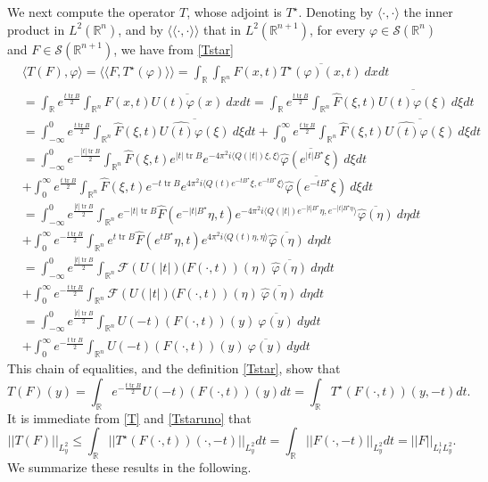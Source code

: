 \documentclass[11pt,letter]{amsart}
\def \phi {\varphi}
\def \R {\mathbb{R}}
\def \vf{\varphi}
\def \So {\mathscr{S}(\Rn)}
\newcommand{\Rn}{\mathbb R^n}
\numberwithin{equation}{section}
\newcommand{\tr}{\operatorname{tr}}
\newcommand{\sa}{\langle}
\newcommand{\da}{\rangle}
\numberwithin{equation}{section}
\begin{document}
We next compute the operator $T$, whose adjoint is $T^\star$. Denoting by $\sa \cdot,\cdot \da$ the inner product in $L^2(\Rn)$, and by $\sa\sa\cdot,\cdot\da\da$ that in $L^2(\R^{n+1})$, for every $\vf\in \So$ and $F\in \mathscr S(\R^{n+1})$, we  have from \eqref{Tstar} 
{\allowdisplaybreaks
\begin{align*}
& \sa T(F),\vf\da = \sa\sa F,T^\star(\vf)\da\da = \int_\R \int_{\Rn} F(x,t) \overline{T^\star(\vf)(x,t)}\ dx dt
\\
& =  \int_\R e^{\frac{t \tr B}2} \int_{\Rn} F(x,t)  \overline{U(t)\vf(x)}\  dx dt = \int_\R e^{\frac{t \tr B}2} \int_{\Rn} \hat F(\xi,t)  \overline{\widehat{U(t)\vf}(\xi)}\  d\xi dt 
\\
& = \int_{-\infty}^0 e^{\frac{t \tr B}2} \int_{\Rn} \hat F(\xi,t)  \overline{\widehat{U(t)\vf}(\xi)}\  d\xi dt  + \int_0^\infty e^{\frac{t \tr B}2} \int_{\Rn} \hat F(\xi,t)  \overline{\widehat{U(t)\vf}(\xi)}\  d\xi dt 
\\
&  = \int_{-\infty}^0 e^{-\frac{|t| \tr B}2} \int_{\Rn} \hat F(\xi,t) e^{|t| \tr B} e^{-4\pi^{2}i\langle Q(|t|)\xi,\xi\rangle} \overline{\hat{\phi}(e^{|t|B^{\star}}\xi)}\  d\xi dt 
\\
& + \int_0^\infty e^{\frac{t \tr B}2} \int_{\Rn} \hat F(\xi,t) e^{-t \tr B}e^{4\pi^{2}i\langle Q(t)e^{-tB^{\star}}\xi, e^{-tB^{\star}}\xi\rangle} \overline{\hat{\phi}(e^{-tB^{\star}}\xi)}\  d\xi dt 
\\
&  = \int_{-\infty}^0 e^{\frac{|t| \tr B}2} \int_{\Rn} e^{-|t| \tr B} \hat F(e^{-|t|B^{\star}}\eta,t) e^{-4\pi^{2}i \langle Q(|t|) e^{-|t|B^\star} \eta,e^{-|t|B^\star \eta}\rangle} \overline{\hat{\phi}(\eta)}\  d\eta dt 
\\
& + \int_0^\infty e^{-\frac{t \tr B}2} \int_{\Rn} e^{t \tr B}\hat F(e^{tB^\star}\eta,t) e^{4\pi^{2}i\langle Q(t)\eta,\eta\rangle} \overline{\hat{\phi}(\eta)}\  d\eta dt 
\\
& = \int_{-\infty}^0 e^{\frac{|t| \tr B}2} \int_{\Rn}  \mathscr F\left(U(|t|)(F(\cdot,t)\right)(\eta)\ \overline{\hat{\phi}(\eta)}\  d\eta dt 
\\
& + \int_0^\infty e^{-\frac{t \tr B}2} \int_{\Rn} \mathscr F\left(U(|t|)(F(\cdot,t)\right)(\eta)\ \overline{\hat{\phi}(\eta)}\  d\eta dt  
\\
& = \int_{-\infty}^0 e^{\frac{|t| \tr B}2} \int_{\Rn} U(-t)\left(F(\cdot,t)\right)(y)\ \overline{\phi(y)}\  dy dt 
\\
& +  \int_0^\infty e^{-\frac{t \tr B}2} \int_{\Rn} U(-t)\left(F(\cdot,t)\right)(y)\ \overline{\phi(y)}\  dy dt 
\end{align*}}
This chain of equalities, and the definition \eqref{Tstar}, show that
\begin{equation}\label{T}
T(F)(y) = \int_\R e^{-\frac{t \tr B}2} U(-t)(F(\cdot,t))(y) dt = \int_\R T^\star(F(\cdot,t))(y,-t) dt.
\end{equation}
It is immediate from \eqref{T} and \eqref{Tstaruno} that
\[
||T(F)||_{L^2_y} \le \int_\R ||T^\star(F(\cdot,t))(\cdot,-t)||_{L^2_y} dt = \int_\R ||F(\cdot,-t)||_{L^2_y} dt = ||F||_{L^1_t L^2_y}.
\]
We summarize these results in the following.
\end{document}
